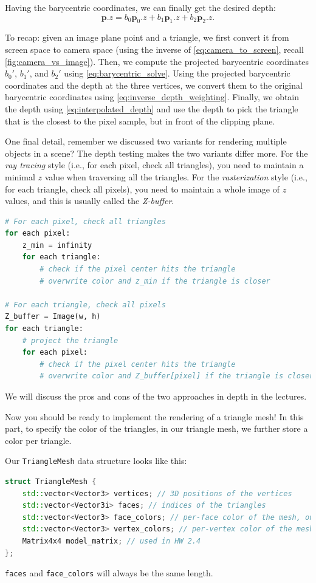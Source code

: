 Having the barycentric coordinates, we can finally get the desired depth:
\begin{equation}
\mathbf{p}.z = b_0 \mathbf{p}_0.z + b_1 \mathbf{p}_1.z + b_2 \mathbf{p}_2.z.
\label{eq:interpolated_depth}
\end{equation}

To recap: given an image plane point and a triangle, we first convert it from screen space to camera space (using the inverse of \cref{eq:camera_to_screen}, recall \cref{fig:camera_vs_image}). Then, we compute the projected barycentric coordinates $b_0'$, $b_1'$, and $b_2'$ using \cref{eq:barycentric_solve}. Using the projected barycentric coordinates and the depth at the three vertices, we convert them to the original barycentric coordinates using \cref{eq:inverse_depth_weighting}. Finally, we obtain the depth using \cref{eq:interpolated_depth} and use the depth to pick the triangle that is the closest to the pixel sample, but in front of the clipping plane.

One final detail, remember we discussed two variants for rendering multiple objects in a scene? The depth testing makes the two variants differ more. For the \emph{ray tracing} style (i.e., for each pixel, check all triangles), you need to maintain a minimal $z$ value when traversing all the triangles. For the \emph{rasterization} style (i.e., for each triangle, check all pixels), you need to maintain a whole image of $z$ values, and this is usually called the \emph{Z-buffer}. 
\begin{lstlisting}[language=Python]
# For each pixel, check all triangles
for each pixel:
    z_min = infinity
    for each triangle:
        # check if the pixel center hits the triangle
        # overwrite color and z_min if the triangle is closer

# For each triangle, check all pixels
Z_buffer = Image(w, h)
for each triangle:
    # project the triangle
    for each pixel:
        # check if the pixel center hits the triangle
        # overwrite color and Z_buffer[pixel] if the triangle is closer
\end{lstlisting}
We will discuss the pros and cons of the two approaches in depth in the lectures.

Now you should be ready to implement the rendering of a triangle mesh! In this part, to specify the color of the triangles, in our triangle mesh, we further store a color per triangle. 

Our \lstinline{TriangleMesh} data structure looks like this:
\begin{lstlisting}[language=C++]
struct TriangleMesh {
    std::vector<Vector3> vertices; // 3D positions of the vertices
    std::vector<Vector3i> faces; // indices of the triangles
    std::vector<Vector3> face_colors; // per-face color of the mesh, only used in HW 2.2
    std::vector<Vector3> vertex_colors; // per-vertex color of the mesh, used in HW 2.3 and later
    Matrix4x4 model_matrix; // used in HW 2.4
};
\end{lstlisting}
\lstinline{faces} and \lstinline{face_colors} will always be the same length.

